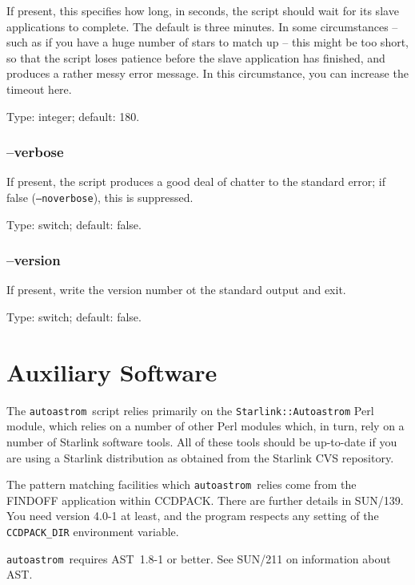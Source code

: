 \documentclass[twoside,11pt]{article}
\newcommand{\xref}[3]{#1}
\newcommand{\xlabel}[1]{}
\newcommand{\AST}{\xref{{\footnotesize AST}}{sun210}{}}
\newcommand{\autoastrom}{\texttt{autoastrom}}
\newcommand{\CCDPACKref}{\xref{{\footnotesize CCDPACK}}{sun139}{}}
\begin{document}
If present, this specifies how long, in seconds, the script should wait for
its slave applications to complete.  The default is three minutes.  In some
circumstances -- such as if you have a huge number of stars to match up --
this might be too short, so that the script loses patience before the slave
application has finished, and produces a rather messy error message.  In this
circumstance, you can increase the timeout here.

Type: integer; default: 180.

\subsubsection{\xlabel{sb_options_verbose}--verbose\label{sb:options:verbose}}

If present, the script produces a good deal of chatter to the standard error;
if false (\texttt{--noverbose}), this is suppressed.

Type: switch; default: false.

\subsubsection{\xlabel{sb_options_version}--version\label{sb:options:version}}

If present, write the version number ot the standard output and exit.

Type: switch; default: false.

\section{\xlabel{se_auxiliary}Auxiliary Software\label{se:auxiliary}}

The \autoastrom\ script relies primarily on the \texttt{Starlink::Autoastrom}
Perl module, which relies on a number of other Perl modules which, in turn,
rely on a number of Starlink software tools. All of these tools should be
up-to-date if you are using a Starlink distribution as obtained from the
Starlink CVS repository.

The pattern matching facilities which \autoastrom\ relies come from the
FINDOFF application within \CCDPACKref. There are further details in
SUN/139. You need version 4.0-1 at least, and the program respects any setting
of the \texttt{CCDPACK\_DIR} environment variable.

\autoastrom\ requires \AST\ 1.8-1 or better. See SUN/211 on information about
AST.
\end{document}
